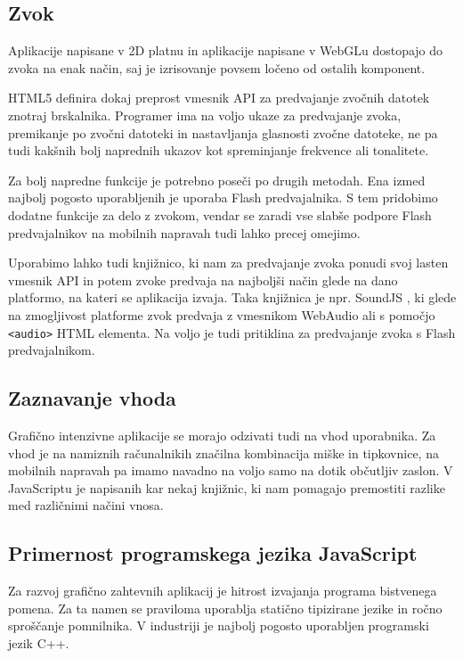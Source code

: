 \subsection{Zvok}

Aplikacije napisane v 2D platnu in aplikacije napisane v WebGLu dostopajo do zvoka na enak način, saj je izrisovanje povsem ločeno od ostalih komponent.

HTML5 definira dokaj preprost vmesnik API za predvajanje zvočnih datotek znotraj brskalnika. Programer ima na voljo ukaze za predvajanje zvoka, premikanje po zvočni datoteki in nastavljanja glasnosti zvočne datoteke, ne pa tudi kakšnih bolj naprednih ukazov kot spreminjanje frekvence ali tonalitete.

Za bolj napredne funkcije je potrebno poseči po drugih metodah. Ena izmed najbolj pogosto uporabljenih je uporaba Flash predvajalnika. S tem pridobimo dodatne funkcije za delo z zvokom, vendar se zaradi vse slabše podpore Flash predvajalnikov na mobilnih napravah tudi lahko precej omejimo. 

Uporabimo lahko tudi knjižnico, ki nam za predvajanje zvoka ponudi svoj lasten vmesnik API in potem zvoke predvaja na najboljši način glede na dano platformo, na kateri se aplikacija izvaja. Taka knjižnica je npr. SoundJS \cite{soundjs}, ki glede na zmogljivost platforme zvok predvaja z vmesnikom WebAudio ali s pomočjo \texttt{<audio>} HTML elementa. Na voljo je tudi pritiklina za predvajanje zvoka s Flash predvajalnikom.
 
\subsection{Zaznavanje vhoda}

Grafično intenzivne aplikacije se morajo odzivati tudi na vhod uporabnika. Za vhod je na namiznih računalnikih značilna kombinacija miške in tipkovnice, na mobilnih napravah pa imamo navadno na voljo samo na dotik občutljiv zaslon. V JavaScriptu je napisanih kar nekaj knjižnic, ki nam pomagajo premostiti razlike med različnimi načini vnosa.

\subsection{Primernost programskega jezika JavaScript}

Za razvoj grafično zahtevnih aplikacij je hitrost izvajanja programa bistvenega pomena. Za ta namen se praviloma uporablja statično tipizirane jezike in ročno sproščanje pomnilnika. V industriji je najbolj pogosto uporabljen programski jezik C++.

